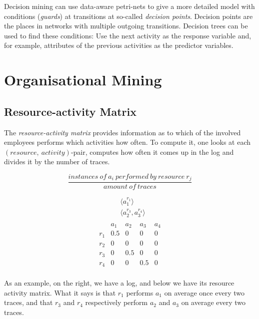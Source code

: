 \documentclass[english]{panikzettel}
\begin{document}
Decision mining can use data-aware petri-nets to give a more detailed model with conditions (\emph{guards}) at transitions at so-called \emph{decision points}.
Decision points are the places in networks with multiple outgoing transitions.
Decision trees can be used to find these conditions: Use the next activity as the response variable and, for example, attributes of the previous activities as the predictor variables.

\section{Organisational Mining}

\subsection{Resource-activity Matrix}

\begin{halfboxl}
The \textit{resource-activity matrix} provides information as to which of the involved employees performs which activities how often. To compute it, one looks at each \((resource, \: activity)\)-pair, computes how often it comes up in the log and divides it by the number of traces.

\[\frac{instances \: of \: a_i \: performed \: by \: resource \: r_j}{amount \: of \: traces}\]
\end{halfboxl}%
\begin{halfboxr}
\vspace{-\baselineskip}
\begin{align*}
    & \langle a_1^{r_1} \rangle \\
    & \langle a_2^{r_3},a_3^{r_4} \rangle \\
\end{align*}
\[\begin{array}{c|c|c|c|c}
        & a_1   & a_2   & a_3   & a_4   \\ \hline
    r_1 & 0.5   & 0     & 0     & 0     \\ \hline
    r_2 & 0     & 0     & 0     & 0     \\ \hline
    r_3 & 0     & 0.5   & 0     & 0     \\ \hline
    r_4 & 0     & 0     & 0.5   & 0     \\
\end{array}\]
\end{halfboxr}

As an example, on the right, we have a log, and below we have its resource activity matrix. What it says is that $r_1$ performs $a_1$ on average once every two traces, and that $r_3$ and $r_4$ respectively perform $a_2$ and $a_3$ on average every two traces.
\end{document}
